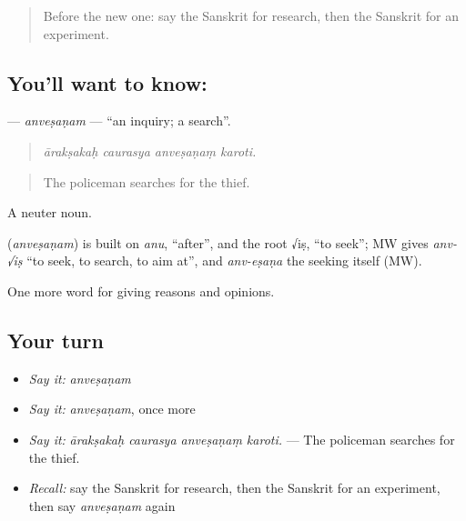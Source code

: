 \label{lesson:SA-C362-anvesanam}



\begin{quote}
Before the new one: say the Sanskrit for research, then the Sanskrit for an experiment.
\end{quote}

\subsection*{You'll want to know: }
\textbf{} — \emph{anveṣaṇam} — \textquotedblleft{}an inquiry; a search\textquotedblright{}.

\begin{quote}
   
\end{quote}

\begin{quote}
\emph{ārakṣakaḥ caurasya anveṣaṇaṃ karoti.}
\end{quote}

\begin{quote}
The policeman searches for the thief.
\end{quote}

A neuter noun.

\begin{cousinweb}
\textbf{} (\emph{anveṣaṇam}) is built on \emph{anu}, \textquotedblleft{}after\textquotedblright{}, and the root √iṣ, \textquotedblleft{}to seek\textquotedblright{}; MW gives \emph{anv-√iṣ} \textquotedblleft{}to seek, to search, to aim at\textquotedblright{}, and \emph{anv-eṣaṇa} the seeking itself (MW).
\end{cousinweb}

\begin{grammarlens}[title={What you've built}]
One more word for giving reasons and opinions.
\end{grammarlens}

\subsection*{Your turn}
\begin{itemize}
\raggedright
  \item \emph{Say it:} \emph{anveṣaṇam}
  \item \emph{Say it:} \emph{anveṣaṇam}, once more
  \item \emph{Say it:} \emph{ārakṣakaḥ caurasya anveṣaṇaṃ karoti.} — The policeman searches for the thief.
  \item \emph{Recall:} say the Sanskrit for research, then the Sanskrit for an experiment, then say \emph{anveṣaṇam} again
\end{itemize}

